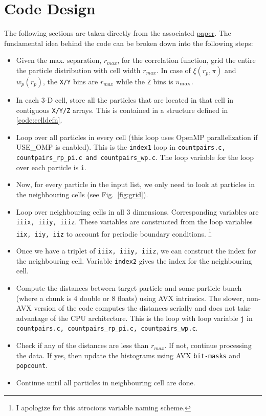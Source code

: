 \documentclass[12pt,titlepage]{article}
\let\stdsection\section
\renewcommand\section{\newpage\stdsection}
\newcommand{\rmax}{\ensuremath{{r_{max}}}\xspace}
\newcommand{\wprp}{\ensuremath{{w_p(r_p)}}\xspace}
\newcommand{\xirppi}{\ensuremath{{\xi(r_p,\pi)}}\xspace}
\begin{document}
\section{Code Design}
The following sections are taken directly from the associated \href{http://adsabs.harvard.edu/abs/2014arXiv1405.5832L}{paper}. The fundamental idea 
behind the code can be broken down into the following steps:
\begin{itemize}
\item Given the max. separation, \rmax, for the correlation function, grid the entire the particle distribution with cell width \rmax. In case of 
\xirppi and \wprp, the \texttt{X/Y} bins are \rmax while the \texttt{Z} bins is $\pi_{\rm max}$. 
\item In each 3-D cell, store all the particles that are located in that cell in contiguous \texttt{X/Y/Z} arrays. This is contained in a structure 
defined in \ref{code:celldefn}. 
\item Loop over all particles in every cell (this loop uses OpenMP parallelization if USE\_OMP is enabled). This is the \texttt{index1} loop in 
\texttt{countpairs.c, countpairs\_rp\_pi.c and countpairs\_wp.c}. The loop variable for the loop over each particle is \texttt{i}.
\item Now, for every particle in the input list, we only need to look at particles in the neighbouring cells (see Fig.~\ref{fig:grid}). 
\item Loop over neighbouring cells in all 3 dimensions. Corresponding variables are \texttt{iiix, iiiy, iiiz}. These variables are constructed from the 
loop variables \texttt{iix, iiy, iiz} to account for periodic boundary conditions. \footnote{I apologize for this atrocious variable naming scheme.}
\item Once we have a triplet of \texttt{iiix, iiiy, iiiz}, we can construct the index for the neighbouring cell. Variable \texttt{index2} gives the index 
for the neighbouring cell. 
\item Compute the distances between target particle and some particle bunch (where a chunk is 4 double or 8 floats) using AVX intrinsics. The slower, non-AVX 
version of the code computes the distances serially and does not take advantage of the CPU architecture. This is the loop with loop variable \texttt{j}
in \texttt{countpairs.c, countpairs\_rp\_pi.c, countpairs\_wp.c}. 
\item Check if any of the distances are less than \rmax. If not, continue processing the data. If yes, then update the histograms using 
AVX \texttt{bit-masks} and \texttt{popcount}. 
\item Continue until all particles in neighbouring cell are done. 
\end{itemize}
\end{document}
